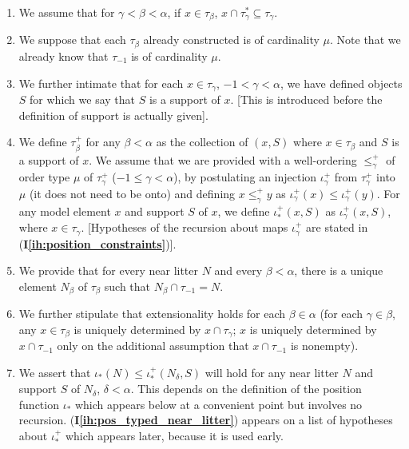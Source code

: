 \documentclass[112pt]{article}
\theoremstyle{definition}
\theoremstyle{remark}
\newcommand{\ihref}[1]{(\textbf{I\ref{#1}})}
\begin{document}
\begin{enumerate}

\renewcommand{\labelenumi}{(\textbf{I\theenumi})}

\item \label{ih:subset_tau} We assume that for $\gamma<\beta<\alpha$, if $x \in \tau_\beta$, $x \cap \tau^*_\gamma \subseteq \tau_\gamma$.

\item \label{ih:cardinality} We suppose that each $\tau_\beta$ already constructed is of cardinality $\mu$.  Note that we already know that
$\tau_{-1}$ is of cardinality $\mu$.

\item \label{ih:supports} We further intimate that for each $x \in \tau_\gamma$, $-1<\gamma<\alpha$, we have defined objects $S$ for which we say that $S$ is a support of $x$.  [This is introduced before the definition of support is actually given].

\item \label{ih:position} We define $\tau_\beta^+$ for any $\beta<\alpha$ as the collection of $(x,S)$ where $x \in \tau_\beta$ and $S$ is a support of $x$.  We assume that we are provided with  a well-ordering $\leq^+_\gamma$ of order type $\mu$ of $\tau_\gamma^+$ ($-1 \leq \gamma <\alpha$), by postulating an injection $\iota^+_\gamma$ from $\tau_\gamma^+$ into $\mu$ (it does not need to be onto) and defining $x \leq^+_\gamma y$ as $\iota^+_\gamma(x) \leq \iota^+_\gamma(y)$.    For any model element $x$ and support $S$ of $x$, we define $\iota^+_*(x,S)$ as $\iota^+_\gamma(x,S)$, where $x \in \tau_\gamma$.    [Hypotheses of the recursion about maps $\iota^+_\gamma$ are stated {in \ihref{ih:position_constraints}}]. %

\item \label{ih:typed_near_litter} We provide that for every near litter $N$ and every $\beta<\alpha$, there is a unique element $N_\beta$ of $\tau_\beta$ such that $N_\beta \cap \tau_{-1}=N$.

\item \label{ih:extensionality} We further stipulate that extensionality holds for each $\beta\in \alpha$ (for each $\gamma\in \beta$, any $x \in \tau_\beta$ is uniquely determined by $x \cap \tau_\gamma$;  $x$ is uniquely determined by $x \cap \tau_{-1}$ only on the additional assumption that $x \cap \tau_{-1}$ is nonempty).

\item \label{ih:pos_typed_near_litter} We assert that $\iota_*(N) \leq \iota_*^+(N_\delta,S)$ will hold for any near litter $N$ and support $S$ of $N_\delta$, $\delta<\alpha$.  This depends on the definition
of the position function $\iota_*$ which appears below at a convenient point but involves no recursion.  \ihref{ih:pos_typed_near_litter} appears on a list of hypotheses about $\iota_*^+$ which appears later, because it is used early.


\end{enumerate}
\end{document}
